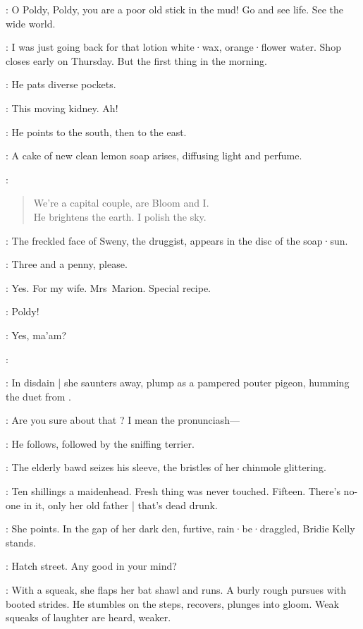 \Marion:
O Poldy,
Poldy,
you are a poor old stick in the mud!
Go and see life.
See the wide world.

\Bloom:
I was just going back for that lotion white·wax,
orange·flower water.
Shop closes early on Thursday.
But the first thing in the morning.

:
He pats diverse pockets.

\Bloom:
This moving kidney.
Ah!

:
He points to the south,
then to the east.

:
A cake of new clean lemon soap arises,
diffusing light and perfume.

\Soap:
\begin{verse}
    We're a capital couple, are Bloom and I.\\
    He brightens the earth. I polish the sky.
\end{verse}

:
The freckled face of Sweny,
the druggist,
appears in the disc of the soap·sun.

\Sweny:
Three and a penny,
please.

\Bloom:
Yes.
For my wife.
Mrs~Marion.
Special recipe.

\Marion:
Poldy!

\Bloom:
Yes,
ma'am?

\Marion:

:
In disdain |
she saunters away,
plump as a pampered pouter pigeon,
humming the duet from .

\Bloom:
Are you sure about that ?
I mean the pronunciash---

:
He follows,
followed by the sniffing terrier.

:
The elderly bawd seizes his sleeve,
the bristles of her chinmole glittering.

\Bawd:
Ten shillings a maidenhead.
Fresh thing was never touched.
Fifteen.
There's no-one in it,
only her old father |
that's dead drunk.

:
She points.
In the gap of her dark den,
furtive,
rain·be·draggled,
Bridie Kelly stands.

\Bridie:
Hatch street.
Any good in your mind?

:
With a squeak,
she flaps her bat shawl and runs.
A burly rough pursues with booted strides.
He stumbles on the steps,
recovers,
plunges into gloom.
Weak squeaks of laughter are heard,
weaker.

